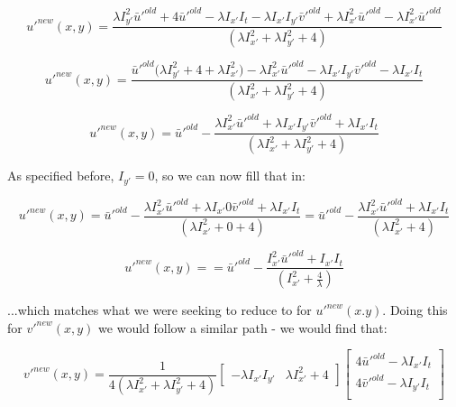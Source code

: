 \documentclass{article}
\begin{document}
\begin{equation}
    u'^{new}(x,y) = \frac
    {\lambda I_{y'}^2 \bar{u}'^{old} + 4\bar{u}'^{old} - \lambda I_{x'} I_t - \lambda I_{x'} I_{y'} \bar{v}'^{old} + \lambda I_{x'}^2\bar{u}'^{old} - \lambda I_{x'}^2\bar{u}'^{old}}
    {(\lambda I_{x'}^2 + \lambda I_{y'}^2 + 4)}
\end{equation}

\begin{equation}
    u'^{new}(x,y) = \frac
    {\bar{u}'^{old} \bigl( \lambda I_{y'}^2 + 4 + \lambda I_{x'}^2 \bigr) - \lambda I_{x'}^2 \bar{u}'^{old} - \lambda I_{x'} I_{y'} \bar{v}'^{old} - \lambda I_{x'} I_t}
    {(\lambda I_{x'}^2 + \lambda I_{y'}^2 + 4)}
\end{equation}

\begin{equation}
    u'^{new}(x,y) = \bar{u}'^{old} - \frac
    {\lambda I_{x'}^2 \bar{u}'^{old} + \lambda I_{x'} I_{y'} \bar{v}'^{old} + \lambda I_{x'} I_t}
    {(\lambda I_{x'}^2 + \lambda I_{y'}^2 + 4)}
\end{equation}

\noindent As specified before, $I_{y'} = 0$, so we can now fill that in:

\begin{equation}
    u'^{new}(x,y) = \bar{u}'^{old} - \frac
    {\lambda I_{x'}^2 \bar{u}'^{old} + \lambda I_{x'} 0 \bar{v}'^{old} + \lambda I_{x'} I_t}
    {(\lambda I_{x'}^2 + 0 + 4)} = \bar{u}'^{old} - \frac
    {\lambda I_{x'}^2 \bar{u}'^{old} + \lambda I_{x'} I_t}
    {(\lambda I_{x'}^2 + 4)}
\end{equation}

\begin{equation}
    u'^{new}(x,y) = = \bar{u}'^{old} - \frac
    {I_{x'}^2 \bar{u}'^{old} + I_{x'} I_t}
    {( I_{x'}^2 + \frac{4}{\lambda})}
\end{equation}

\noindent ...which matches what we were seeking to reduce to for $u'^{new}(x.y)$. Doing this for $v'^{new}(x,y)$ we would follow a similar path - we would find that:


\begin{equation}
    v'^{new}(x,y) = \frac{1}{4(\lambda I_{x'}^2+\lambda I_{y'}^2 + 4)}\begin{bmatrix}
        -\lambda I_{x'} I_{y'} & \lambda I_{x'}^2 + 4
    \end{bmatrix}\begin{bmatrix}
        4\bar{u}'^{old}-\lambda I_{x'} I_t \\
        4\bar{v}'^{old}-\lambda I_{y'} I_t \\
    \end{bmatrix}
\end{equation}
\end{document}
